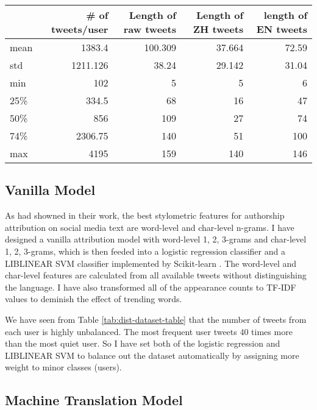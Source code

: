 \documentclass[11pt,a4paper]{article}
\begin{document}
\begin{table*}[t]
  \begin{center}
  \begin{tabular}{|l|r|r|r|r|}
  \hline & \bf \# of tweets/user & \bf Length of raw tweets & \bf Length of ZH tweets & \bf length of EN tweets \\ \hline
  mean & 1383.4 & 100.309 & 37.664 & 72.59 \\
  std & 1211.126 & 38.24 & 29.142 & 31.04  \\
  min & 102 & 5 & 5 & 6 \\
  25\% & 334.5 & 68 & 16 & 47 \\
  50\% & 856 & 109 & 27 & 74 \\
  74\% & 2306.75 & 140 & 51 & 100 \\
  max & 4195 & 159 & 140 & 146 \\
  \hline
  \end{tabular}
  \end{center}
  \caption{\label{tab:dist-dataset-table} Distribution of the Dataset}
\end{table*}

\subsection{Vanilla Model}

As \citet{rocha2016authorship} had showned in their work, the best stylometric features for authorship attribution on social media text are word-level and char-level n-grams. I have designed a vanilla attribution model with word-level 1, 2, 3-grams and char-level 1, 2, 3-grams, which is then feeded into a logistic regression classifier and a LIBLINEAR\cite{REF08a} SVM classifier implemented by Scikit-learn \cite{scikit-learn}. The word-level and char-level features are calculated from all available tweets without distinguishing the language. I have also transformed all of the appearance counts to TF-IDF values to deminish the effect of trending words.

We have seen from Table \ref{tab:dist-dataset-table} that the number of tweets from each user is highly unbalanced. The most frequent user tweets 40 times more than the most quiet user. So I have set both of the logistic regression and LIBLINEAR SVM to balance out the dataset automatically by assigning more weight to minor classes (users).

\subsection{Machine Translation Model}
\end{document}
